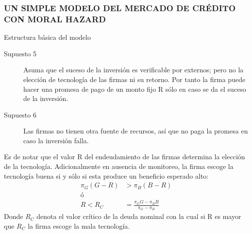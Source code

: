 \documentclass[10pt, xcolor=table, x11names]{beamer}
\begin{document}
\begin{frame}
    \frametitle{{\normalsize UN SIMPLE MODELO DEL MERCADO DE CRÉDITO CON MORAL HAZARD} {}}
    
    \begin{block} {Estructura básica del modelo}
        \begin{description}
             \item[Supuesto 5] Asuma que el suceso de la inversión es verificable por externos; pero no la elección de tecnología de las firmas ni su retorno. Por tanto la firma puede hacer una promesa de pago de un monto fijo R sólo en caso se da el suceso de la inversión.
            \item[Supuesto 6] Las firmas no tienen otra fuente de recursos, así que no paga la promesa en caso la inversión falla.
            
        \end{description}
          
    \end{block}	

    Es de notar que el valor R del endeudamiento de las firmas determina la elección de la tecnología. Adicionalmente en ausencia de monitoreo, la firma escoge la tecnología buena si y sólo si esta produce un beneficio esperado alto:
    \begin{align}
    \pi_{G}(G-R)&>\pi_{B}(B-R) \\
    ó \nonumber \\
    R<R_{C}&=\frac{\pi_{G}G-\pi_{B}B}{\pi_{G}-\pi_{B}}    
    \end{align}
    Donde $R_{C}$ denota el valor crítico de la deuda nominal con la cual si R es mayor que $R_{C}$ la firma escoge la mala tecnología. 
\end{frame}
\end{document}
